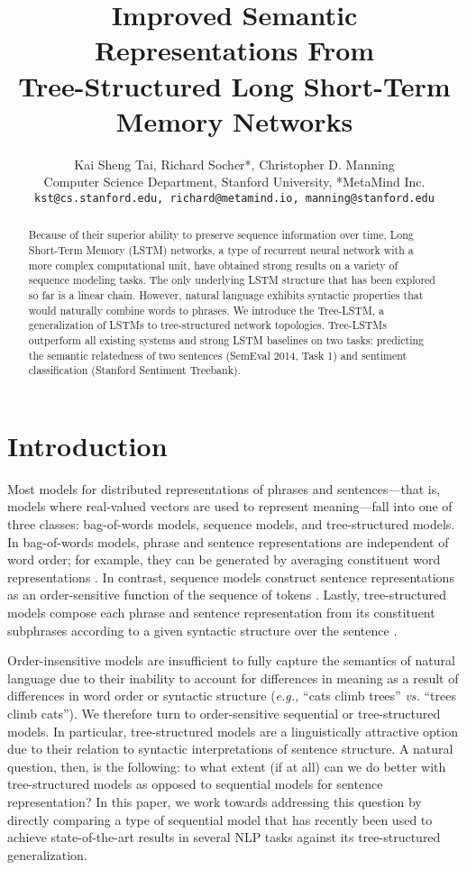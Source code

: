 \documentclass[11pt]{article}
\title{Improved Semantic Representations From \\ Tree-Structured Long Short-Term Memory Networks}
\author{Kai Sheng Tai, Richard Socher*, Christopher D. Manning \\
  Computer Science Department, Stanford University, *MetaMind Inc. \\
  {\tt kst@cs.stanford.edu, richard@metamind.io, manning@stanford.edu}}
\date{}
\begin{document}
\maketitle
\begin{abstract}
Because of their superior ability to preserve sequence information over time, Long Short-Term Memory (LSTM) networks, a type of recurrent neural network with a more complex computational unit, have obtained strong results on a variety of sequence modeling tasks. The only underlying LSTM structure that has been explored so far is a linear chain. However, natural language exhibits syntactic properties that would naturally combine words to phrases.
We introduce the Tree-LSTM, a generalization of LSTMs to tree-structured network topologies. Tree-LSTMs outperform all existing systems and strong LSTM baselines on two tasks: predicting the semantic relatedness of two sentences (SemEval 2014, Task 1) and sentiment classification (Stanford Sentiment Treebank).

\end{abstract}

\section{Introduction}		

Most models for distributed representations of phrases and sentences---that is, models where real-valued vectors are used to represent meaning---fall into one of three classes: bag-of-words models, 
 sequence models, and tree-structured models. In bag-of-words models, phrase and sentence representations are independent of word order; for example, they can be generated by averaging constituent word representations \citep{landauer1997solution,foltz1998measurement}.
  In contrast, sequence models construct sentence representations as an order-sensitive function of the sequence of tokens \citep{elman1990finding,mikolov2012statistical}.
   Lastly, tree-structured models compose each phrase and sentence representation from its constituent subphrases according to a given syntactic structure over the sentence \citep{goller1996learning,socher2011parsing}.

Order-insensitive models are insufficient to fully capture the semantics of natural language due to their inability to account for differences in meaning as a result of differences in word order or syntactic structure (\emph{e.g.,} ``cats climb trees'' \emph{vs.} ``trees climb cats'').  We therefore turn to order-sensitive sequential or tree-structured models. 
 In particular, tree-structured models are a linguistically attractive option due to their relation to syntactic interpretations of sentence structure.   A natural question, then, is the following: to what extent (if at all) can we do better with tree-structured models as opposed to sequential models for sentence representation? In this paper, we work towards addressing this question by directly comparing a type of sequential model that has recently been used to achieve state-of-the-art results in several NLP tasks against its tree-structured generalization.
\end{document}
